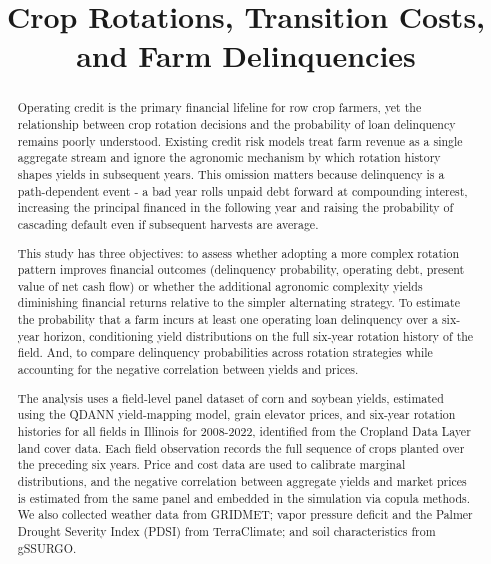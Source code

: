 \documentclass[12pt]{article}
\title{Crop Rotations, Transition Costs, and Farm Delinquencies}
\author{}
\date{}
\begin{document}
\maketitle

\begin{abstract}

Operating credit is the primary financial lifeline for row crop farmers, yet the relationship between crop rotation decisions and the probability of loan delinquency remains poorly understood. Existing credit risk models treat farm revenue as a single aggregate stream and ignore the agronomic mechanism by which rotation history shapes yields in subsequent years. This omission matters because delinquency is a path-dependent event - a bad year rolls unpaid debt forward at compounding interest, increasing the principal financed in the following year and raising the probability of cascading default even if subsequent harvests are average.

This study has three objectives: to assess whether adopting a more complex rotation pattern improves financial outcomes (delinquency probability, operating debt, present value of net cash flow) or whether the additional agronomic complexity yields diminishing financial returns relative to the simpler alternating strategy. To estimate the probability that a farm incurs at least one operating loan delinquency over a six-year horizon, conditioning yield distributions on the full six-year rotation history of the field. And, to compare delinquency probabilities across rotation strategies  while accounting for the negative correlation between yields and prices.


The analysis uses a field-level panel dataset of corn and soybean yields, estimated using the QDANN yield-mapping model, grain elevator prices, and six-year rotation histories for all fields in Illinois for 2008-2022, identified from the Cropland Data Layer land cover data. Each field observation records the full sequence of crops planted over the preceding six years. Price and cost data are used to calibrate marginal distributions, and the negative correlation between aggregate yields and market prices is estimated from the same panel and embedded in the simulation via copula methods. We also collected weather data from GRIDMET; vapor pressure deficit and the Palmer Drought Severity Index (PDSI) from TerraClimate; and soil characteristics from gSSURGO.


\end{abstract}
\end{document}
